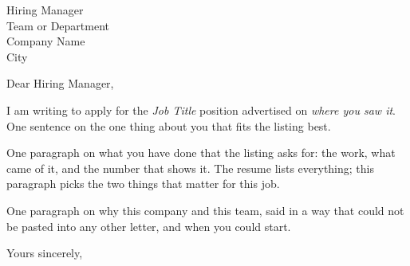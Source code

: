 \documentclass[11pt]{letter}
\begin{document}
\begin{letter}{Hiring Manager \\ Team or Department \\ Company Name \\ City}

\opening{Dear Hiring Manager,}

I am writing to apply for the \emph{Job Title} position advertised on
\emph{where you saw it}. One sentence on the one thing about you that fits
the listing best.

One paragraph on what you have done that the listing asks for: the work,
what came of it, and the number that shows it. The resume lists everything;
this paragraph picks the two things that matter for this job.

One paragraph on why this company and this team, said in a way that could
not be pasted into any other letter, and when you could start.

\closing{Yours sincerely,}

\end{letter}
\end{document}
